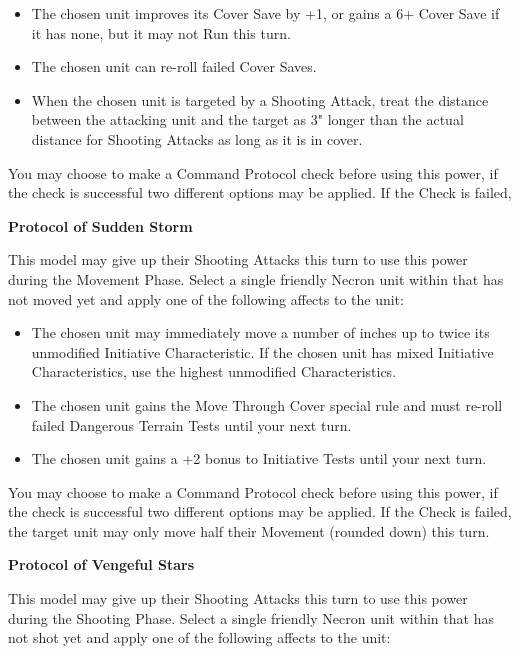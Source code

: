 \begin{multicols}{2}
\begin{itemize}
	\itemsep 0pt
	\item The chosen unit improves its Cover Save by +1, or gains a 6+ Cover Save if it has none, but it may not Run this turn.
	\item The chosen unit can re-roll failed Cover Saves.
	\item When the chosen unit is targeted by a Shooting Attack, treat the distance between the attacking unit and the target as 3" longer than the actual distance for Shooting Attacks as long as it is in cover.
\end{itemize}

You may choose to make a Command Protocol check before using this power, if the check is successful two different options may be applied. If the Check is failed, %

\textbf{Protocol of Sudden Storm}

This model may give up their Shooting Attacks this turn to use this power during the Movement Phase. Select a single friendly Necron unit within  that has not moved yet and apply one of the following affects to the unit:

\begin{itemize}
	\itemsep 0pt
	\item The chosen unit may immediately move a number of inches up to twice its unmodified Initiative Characteristic. If the chosen unit has mixed Initiative Characteristics, use the highest unmodified Characteristics.
	\item The chosen unit gains the Move Through Cover special rule and must re-roll failed Dangerous Terrain Tests until your next turn.
	\item The chosen unit gains a +2 bonus to Initiative Tests until your next turn.
\end{itemize}

You may choose to make a Command Protocol check before using this power, if the check is successful two different options may be applied. If the Check is failed, the target unit may only move half their Movement (rounded down) this turn.

\textbf{Protocol of Vengeful Stars}

This model may give up their Shooting Attacks this turn to use this power during the Shooting Phase. Select a single friendly Necron unit within  that has not shot yet and apply one of the following affects to the unit:


\end{multicols}
